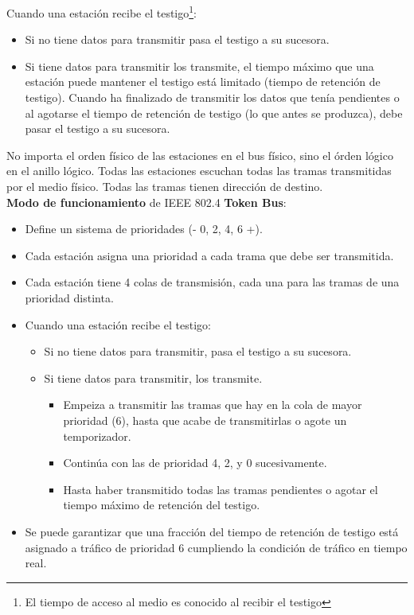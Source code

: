 \documentclass[10pt,portrait, twocolumn]{article}
\begin{document}
	\quad Cuando una estación recibe el testigo\footnote{El tiempo de acceso al medio es conocido al recibir el testigo}:
	
	\begin{itemize}
	\item  Si no tiene datos para transmitir pasa el testigo a su sucesora.
	\item Si tiene datos para transmitir los transmite, el tiempo máximo que una estación puede mantener el testigo está limitado (tiempo de retención de testigo). Cuando ha finalizado de transmitir los datos que tenía pendientes o al agotarse el tiempo de retención de testigo (lo que antes se produzca), debe pasar el testigo a su sucesora.
	\end{itemize} 

No importa el orden físico de las estaciones en el bus físico, sino el órden lógico en el anillo lógico. Todas las estaciones escuchan todas las tramas transmitidas por el medio físico. Todas las tramas tienen dirección de destino.\\

\textbf{Modo de funcionamiento} de IEEE 802.4 \textbf{Token Bus}:

	\begin{itemize}
		\item Define un sistema de prioridades (- 0, 2, 4, 6 +). 
		\item Cada estación asigna una prioridad a cada trama que debe ser transmitida.
		\item Cada estación tiene 4 colas de transmisión, cada una para las tramas de una prioridad distinta.
		\item Cuando una estación recibe el testigo:
		
			\begin{itemize}
				\item Si no tiene datos para transmitir, pasa el testigo a su sucesora.
				\item Si tiene datos para transmitir, los transmite.
				
					\begin{itemize}
					\item Empeiza a transmitir las tramas que hay en la cola de mayor prioridad (6), hasta que acabe de transmitirlas o agote un temporizador. 
					\item Continúa con las de prioridad 4, 2, y 0 sucesivamente.
					\item Hasta haber transmitido todas las tramas pendientes o agotar el tiempo máximo de retención del testigo.
					\end{itemize}
				
			\end{itemize}
			
		\item Se puede garantizar que una fracción del tiempo de retención de testigo está asignado a tráfico de prioridad 6 cumpliendo la condición de tráfico en tiempo real.
	\end{itemize}
	
\end{document}
